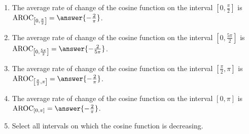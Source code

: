 \documentclass{ximera}
\author{Kenneth Berglund}
\begin{document}
\licenseAPC
\begin{exercise}
\begin{enumerate}
\item The average rate of change of the cosine function on the interval $\left[0, \frac{\pi}{2}\right]$ is $\av_{\left[0, \frac{\pi}{2}\right]} = \answer{-\frac{2}{\pi}}$.

\item The average rate of change of the cosine function on the interval $\left[0, \frac{5\pi}{2}\right]$ is $\av_{\left[0, \frac{5\pi}{2}\right]} = \answer{-\frac{2}{5\pi}}$.

\item The average rate of change of the cosine function on the interval $\left[\frac{\pi}{2}, 
\pi\right]$ is $\av_{\left[\frac{\pi}{2}, \pi\right]} = \answer{-\frac{2}{\pi}}$.

\item The average rate of change of the cosine function on the interval $\left[0, 
\pi\right]$ is $\av_{\left[0, \pi\right]} = \answer{-\frac{2}{\pi}}$.

\item Select all intervals on which the cosine function is decreasing.
\begin{selectAll}
\end{selectAll}
\end{enumerate}

\end{exercise}
\end{document}
